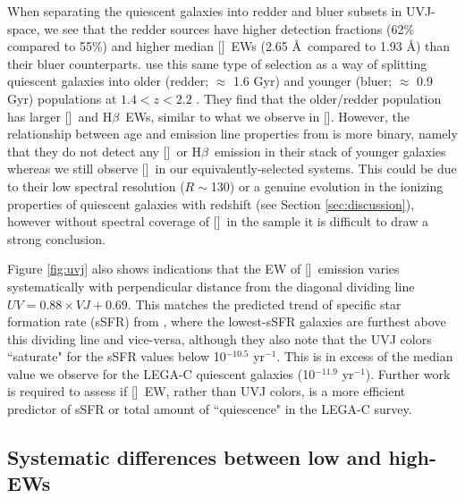 \documentclass[twocolumn,natbib,iop,hyperref]{aastex62}
\newcommand{\hb}{H$\beta$}
\newcommand{\oiii}{[\ion{O}{3}]}
\newcommand{\oii}{[\ion{O}{2}]}
\begin{document}
When separating the quiescent galaxies into redder and bluer subsets in UVJ-space, we see that the redder sources have higher detection fractions (62\% compared to 55\%) and higher median \oii\ EWs (2.65 \AA\ compared to 1.93 \AA) than their bluer counterparts.  \citet{2013ApJ...770L..39W} use this same type of selection as a way of splitting quiescent galaxies into older (redder; $\approx$ 1.6 Gyr) and younger (bluer; $\approx$ 0.9 Gyr) populations at $1.4 < z < 2.2$ \cite[see also][]{2010ApJ...719.1715W}.  They find that the older/redder population has larger \oiii\ and \hb\ EWs, similar to what we observe in \oii.  However, the relationship between age and emission line properties from \citet{2013ApJ...770L..39W} is more binary, namely that they do not detect any \oiii\ or \hb\ emission in their stack of younger galaxies whereas we still observe \oii\ in our equivalently-selected systems.  This could be due to their low spectral resolution ($R\sim$130) or a genuine evolution in the ionizing properties of quiescent galaxies with redshift (see Section \ref{sec:discussion}), however without spectral coverage of \oii\ in the \citet{2013ApJ...770L..39W} sample it is difficult to draw a strong conclusion.

Figure \ref{fig:uvj} also shows indications that the EW of \oii\ emission varies systematically with perpendicular distance from the diagonal dividing line $UV = 0.88 \times VJ + 0.69$.  This matches the predicted trend of specific star formation rate (sSFR) from \citet{2019ApJ...880L...9L}, where the lowest-sSFR galaxies are furthest above this dividing line and vice-versa, although they also note that the UVJ colors ``saturate" for the sSFR values below 10$^{-10.5}$ yr$^{-1}$.  This is in excess of the median value we observe for the LEGA-C quiescent galaxies (10$^{-11.9}$ yr$^{-1}$).  Further work is required to assess if \oii\ EW, rather than UVJ colors, is a more efficient predictor of sSFR or total amount of ``quiescence" in the LEGA-C survey. 


\subsection{Systematic differences between low and high-EWs}
\label{sec:diffs}
\end{document}

